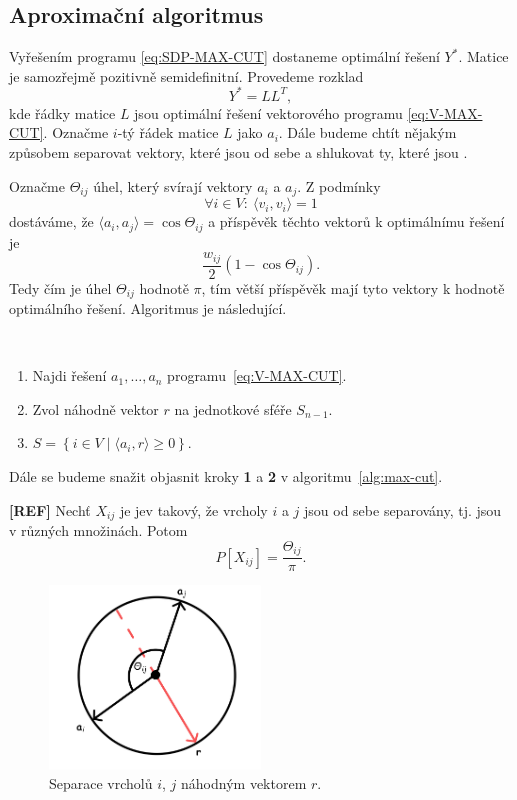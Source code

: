 \subsection{Aproximační algoritmus}

Vyřešením programu \ref{eq:SDP-MAX-CUT} dostaneme optimální řešení $Y^*$. Matice je samozřejmě pozitivně semidefinitní. Provedeme rozklad
$$
    Y^* = LL^T,
$$
kde řádky matice $L$ jsou optimální řešení vektorového programu \ref{eq:V-MAX-CUT}. Označme $i$-tý řádek matice $L$ jako $a_i$. Dále budeme chtít nějakým způsobem separovat vektory, které jsou od sebe  a shlukovat ty, které jsou .

Označme $\Theta_{ij}$ úhel, který svírají vektory $a_i$ a $a_j$. Z podmínky
$$
    \forall i \in V:\ \langle v_i, v_i \rangle = 1
$$
dostáváme, že $\langle a_i, a_j \rangle = \cos \Theta_{ij}$ a příspěvěk těchto vektorů k optimálnímu řešení je
$$
    \frac{w_{ij}}{2} (1 - \cos \Theta_{ij}).
$$
Tedy čím  je úhel $\Theta_{ij}$ hodnotě $\pi$, tím větší příspěvěk mají tyto vektory k hodnotě optimálního řešení. Algoritmus je následující.

\begin{alg}$ $
    \begin{enumerate}
        \item Najdi řešení $a_1, \dots, a_n$ programu~\ref{eq:V-MAX-CUT}.
        \item Zvol náhodně vektor $r$ na jednotkové sféře $S_{n-1}$.
        \item $S = \left\{ i \in V \mid \langle a_i, r \rangle \geq 0 \right\}$.
    \end{enumerate}
    \label{alg:max-cut}
\end{alg}

Dále se budeme snažit objasnit kroky \textbf{1} a \textbf{2} v algoritmu~\ref{alg:max-cut}.

\begin{lm}\textbf{[REF]}
    Nechť $X_{ij}$ je jev takový, že vrcholy $i$ a $j$ jsou od sebe separovány, tj. jsou v různých množinách. Potom
    $$
        P\left[ X_{ij} \right] = \frac{\Theta_{ij}}{\pi}.
    $$
    \label{lemma:sep}
\end{lm}

\begin{figure}[h!]
    \centering
    \includegraphics[width=0.5\textwidth]{img/lemma_plane.png}   
    \caption{Separace vrcholů $i$, $j$ náhodným vektorem $r$.}
    \label{fig:lemma_plane}
\end{figure}

